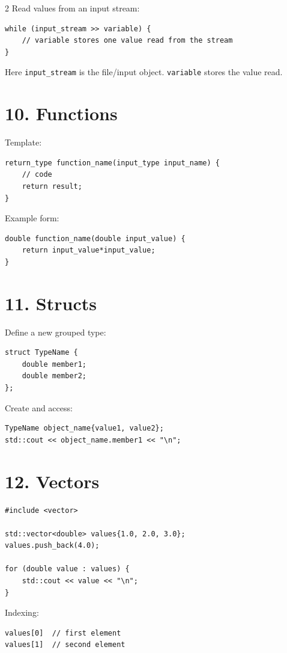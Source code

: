 \documentclass[10pt]{article}
\begin{document}
\begin{multicols}{2}
Read values from an input stream:
\begin{lstlisting}[style=cppstyle]
while (input_stream >> variable) {
    // variable stores one value read from the stream
}
\end{lstlisting}

Here \texttt{input\_stream} is the file/input object. \texttt{variable} stores the value read.

\section{10. Functions}
Template:
\begin{lstlisting}[style=cppstyle]
return_type function_name(input_type input_name) {
    // code
    return result;
}
\end{lstlisting}

Example form:
\begin{lstlisting}[style=cppstyle]
double function_name(double input_value) {
    return input_value*input_value;
}
\end{lstlisting}

\section{11. Structs}
Define a new grouped type:
\begin{lstlisting}[style=cppstyle]
struct TypeName {
    double member1;
    double member2;
};
\end{lstlisting}

Create and access:
\begin{lstlisting}[style=cppstyle]
TypeName object_name{value1, value2};
std::cout << object_name.member1 << "\n";
\end{lstlisting}

\section{12. Vectors}
\begin{lstlisting}[style=cppstyle]
#include <vector>

std::vector<double> values{1.0, 2.0, 3.0};
values.push_back(4.0);

for (double value : values) {
    std::cout << value << "\n";
}
\end{lstlisting}

Indexing:
\begin{lstlisting}[style=cppstyle]
values[0]  // first element
values[1]  // second element
\end{lstlisting}


\end{multicols}
\end{document}
